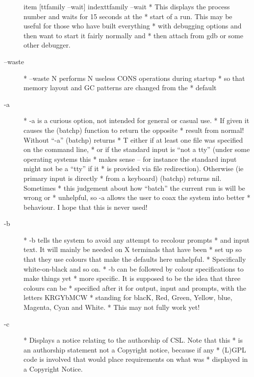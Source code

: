 \documentclass[a4paper,11pt]{article}
\begin{document}
\begin{description}
item [{ttfamily --wait}] index{{ttfamily --wait}}
          * This displays the process number and waits for 15 seconds at the
          * start of a run. This may be useful for those who have built everything
          * with debugging options and then want to start it fairly normally and
          * then attach from gdb or some other debugger.

\item [{\ttfamily --waste}] 
          * --waste N performs N useless CONS operations during startup
          * so that memory layout and GC patterns are changed from the
          * default

\item [{\ttfamily -a}] 
          * {\ttfamily -a} is a curious option, not intended for general or casual use.
          * If given it causes the {\ttfamily (batchp)} function to return the opposite
          * result from normal!  Without ``{\ttfamily -a}'' {\ttfamily (batchp)} returns
          * {\ttfamily T} either if at least one file was specified on the command line,
          * or if the standard input is ``not a tty'' (under some operating systems this
          * makes sense -- for instance the standard input might not be a ``tty'' if it
          * is provided via file redirection).  Otherwise (ie primary input is directly
          * from a keyboard) {\ttfamily (batchp)} returns {\ttfamily nil}.  Sometimes
          * this judgement about how ``batch'' the current run is will be wrong or
          * unhelpful, so {\ttfamily -a} allows the user to coax the system into better
          * behaviour.  I hope that this is never used!

\item [{\ttfamily -b}] 
          * {\ttfamily -b} tells the system to avoid any attempt to recolour prompts
          * and input text. It will mainly be needed on X terminals that have been
          * set up so that they use colours that make the defaults here unhelpful.
          * Specifically white-on-black and so on.
          * {\ttfamily -b} can be followed by colour specifications to make things yet
          * more specific. It is supposed to be the idea that three colours can be
          * specified after it for output, input and prompts, with the letters KRGYbMCW
          * standing for blacK, Red, Green, Yellow, blue, Magenta, Cyan and White.
          * This may not fully work yet!

\item [{\ttfamily -c}] 
          * Displays a notice relating to the authorship of CSL. Note that this
          * is an authorship statement not a Copyright notice, because if any
          * (L)GPL code is involved that would place requirements on what was
          * displayed in a Copyright Notice.


\end{description}
\end{document}
